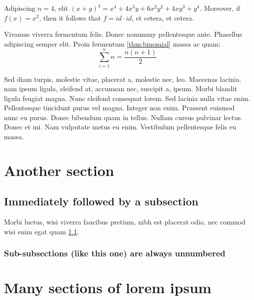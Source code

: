 \documentclass{rntz}
\begin{document}
\begin{corollary} Adipiscing $n=4$, elit
  \( (x+y)^4 = x^4 + 4x^3y + 6x^2y^2 + 4xy^3 + y^4 \). Moreover, if $f(x) =
  x^2$, then it follows that $f = \mathit{id} \cdot \mathit{id}$, et cetera, et
  cetera.
\end{corollary}

Vivamus viverra fermentum felis. Donec nonummy pellentesque ante. Pha\-sellus
adipiscing semper elit. Proin fermentum \cref{thm:binomial} massa ac quam:
\nopagebreak[2]
\[ \sum_{i=1}^n n = \frac{n(n+1)}{2} \]


Sed diam turpis, molestie vitae, placerat a, molestie nec, leo. Maecenas
lacinia.  nam ipsum ligula, eleifend at, accumsan nec, suscipit a,
ipsum. Morbi blandit ligula feugiat magna. Nunc eleifend consequat lorem. Sed
lacinia nulla vitae enim. Pellentesque tincidunt purus vel magna. Integer non
enim. Praesent euismod nunc eu purus. Donec bibendum quam in tellus. Nullam
cursus pulvinar lectus. Donec et mi. Nam vulputate metus eu enim. Vestibulum
pellentesque felis eu massa.

\section{Another section}\label{sec:two}
\subsection{Immediately followed by a subsection}\label{sec:two-one}

\lipsum[6]

\begin{conjecture}
  Morbi luctus, wisi viverra faucibus pretium, nibh est placerat odio, nec
  commod wisi enim egat quam \cref{sec:two-one}.
\end{conjecture}

\subsubsection{Sub-subsections (like this one) are always unnumbered}

\lipsum[7]


\section{Many sections of lorem ipsum}
\lipsum[8]
\end{document}
